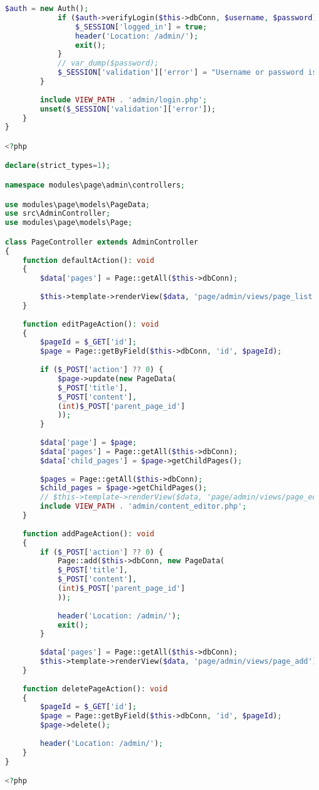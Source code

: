 \begin{lstlisting}[language=PHP, frame=none]
			$auth = new Auth();
			if ($auth->verifyLogin($this->dbConn, $username, $password)) {
				$_SESSION['logged_in'] = true;
				header('Location: /admin/');
				exit();
			}
			// var_dump($password);
			$_SESSION['validation']['error'] = "Username or password is incorrect";
		}
		
		include VIEW_PATH . 'admin/login.php';
		unset($_SESSION['validation']['error']);
	}
}

<?php

declare(strict_types=1);

namespace modules\page\admin\controllers;

use modules\page\models\PageData;
use src\AdminController;
use modules\page\models\Page;

class PageController extends AdminController
{
	function defaultAction(): void
	{
		$data['pages'] = Page::getAll($this->dbConn);
		
		$this->template->renderView($data, 'page/admin/views/page_list');
	}
	
	function editPageAction(): void
	{
		$pageId = $_GET['id'];
		$page = Page::getByField($this->dbConn, 'id', $pageId);
		
		if ($_POST['action'] ?? 0) {
			$page->update(new PageData(
			$_POST['title'],
			$_POST['content'],
			(int)$_POST['parent_page_id']
			));
		}
		
		$data['page'] = $page;
		$data['pages'] = Page::getAll($this->dbConn);
		$data['child_pages'] = $page->getChildPages();
		
		$pages = Page::getAll($this->dbConn);
		$child_pages = $page->getChildPages();
		// $this->template->renderView($data, 'page/admin/views/page_edit');
		include VIEW_PATH . 'admin/content_editor.php';
	}
	
	function addPageAction(): void
	{
		if ($_POST['action'] ?? 0) {
			Page::add($this->dbConn, new PageData(
			$_POST['title'],
			$_POST['content'],
			(int)$_POST['parent_page_id']
			));
			
			header('Location: /admin/');
			exit();
		}
		
		$data['pages'] = Page::getAll($this->dbConn);
		$this->template->renderView($data, 'page/admin/views/page_add');
	}
	
	function deletePageAction(): void
	{
		$pageId = $_GET['id'];
		$page = Page::getByField($this->dbConn, 'id', $pageId);
		$page->delete();
		
		header('Location: /admin/');
	}
}

<?php


\end{lstlisting}
